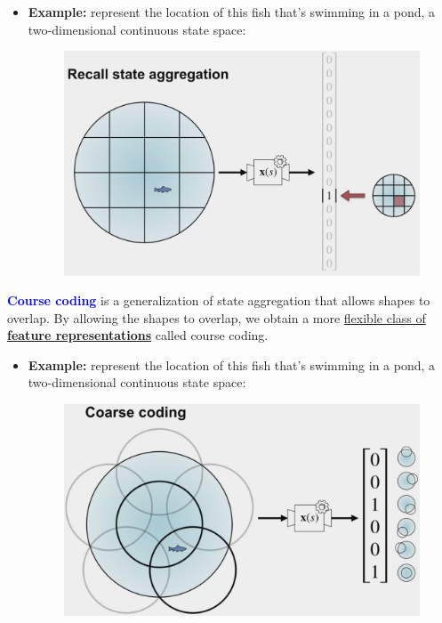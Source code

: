 \documentclass[12pt, a4paper]{article}
\begin{document}
\begin{itemize}
  \item \textbf{Example:} represent the location of this fish that's swimming in a pond, a two-dimensional continuous state space:
  \begin{figure}[H]
    \centering
      \includegraphics[width=0.7\columnwidth]{images/state-aggregation-eg.png}
      \label{fig:state-aggregation-eg}
  \end{figure}
\end{itemize}



\textbf{\textcolor{blue}{Course coding}} is a generalization of state aggregation that allows shapes to overlap. By allowing the shapes to overlap, we obtain a more \uline{flexible class of \textbf{feature representations}} called course coding.

\begin{itemize}
  \item \textbf{Example:} represent the location of this fish that's swimming in a pond, a two-dimensional continuous state space:
  \begin{figure}[H]
    \centering
      \includegraphics[width=0.7\columnwidth]{images/coarse-coding-eg.png}
      \label{fig:coarse-coding-eg}
  \end{figure}
\end{itemize}
\end{document}
